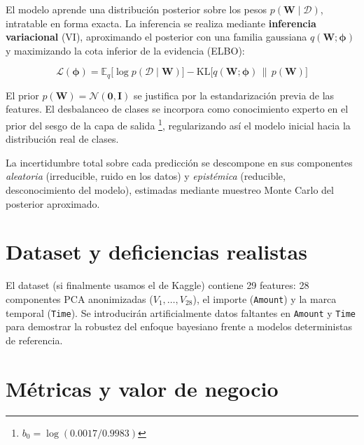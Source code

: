 \documentclass[11pt, a4paper]{article}
\begin{document}
El modelo aprende una distribución posterior sobre los pesos $p(\mathbf{W} \mid \mathcal{D})$, intratable en forma exacta. La inferencia se realiza mediante \textbf{inferencia variacional} (VI), aproximando el posterior con una familia gaussiana $q(\mathbf{W}; \boldsymbol{\phi})$ y maximizando la cota inferior de la evidencia (ELBO):

\begin{equation}
    \mathcal{L}(\boldsymbol{\phi}) = \mathbb{E}_{q}\bigl[\log p(\mathcal{D} \mid \mathbf{W})\bigr] - \mathrm{KL}\bigl[q(\mathbf{W};\boldsymbol{\phi}) \,\|\, p(\mathbf{W})\bigr]
\end{equation}

El prior $p(\mathbf{W}) = \mathcal{N}(\mathbf{0}, \mathbf{I})$ se justifica por la estandarización previa de las features. El desbalanceo de clases se incorpora como conocimiento experto en el prior del sesgo de la capa de salida \footnote{$b_0 = \log(0.0017 / 0.9983)$}, regularizando así el modelo inicial hacia la distribución real de clases.

La incertidumbre total sobre cada predicción se descompone en sus componentes \textit{aleatoria} (irreducible, ruido en los datos) y \textit{epistémica} (reducible, desconocimiento del modelo), estimadas mediante muestreo Monte Carlo del posterior aproximado.

\newpage

\section{Dataset y deficiencias realistas}

El dataset (si finalmente usamos el de Kaggle) contiene 29 features: 28 componentes PCA anonimizadas ($V_1, \ldots, V_{28}$), el importe (\texttt{Amount}) y la marca temporal (\texttt{Time}). Se introducirán artificialmente datos faltantes en \texttt{Amount} y \texttt{Time} para demostrar la robustez del enfoque bayesiano frente a modelos deterministas de referencia.

\section{Métricas y valor de negocio}

\end{document}
